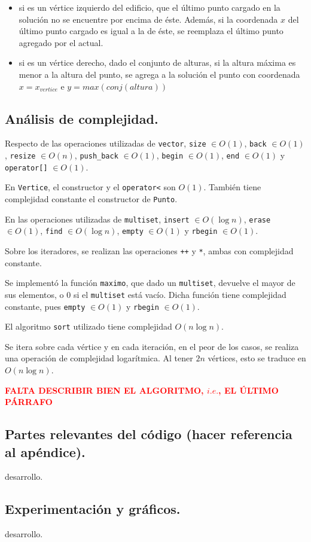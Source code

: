 \begin{itemize}
  \item si es un vértice izquierdo del edificio, que el último punto cargado en
  la solución no se encuentre por encima de éste. Además, si la coordenada $x$ 
  del último punto cargado es igual a la de éste, se reemplaza el último punto 
  agregado por el actual.
  
  \item si es un vértice derecho, dado el conjunto de alturas, si la altura 
  máxima es menor a la altura del punto, se agrega a la solución el punto con 
  coordenada $x = x_{vertice}$ e $y = max(conj(altura))$
\end{itemize}



\subsection{Análisis de complejidad.}

\vspace*{0.3cm}

Respecto de las operaciones utilizadas de \verb|vector|, \verb|size| $\in O(1)$,
\verb|back| $\in O(1)$, \verb|resize| $\in O(n)$, \verb|push_back| $\in O(1)$, 
\verb|begin| $\in O(1)$, \verb|end| $\in O(1)$ y \verb|operator[]| $\in O(1)$.

\noindent
En \verb|Vertice|, el constructor y el \verb|operator<| son $O(1)$. También 
tiene complejidad constante el constructor de \verb|Punto|.

\noindent
En las operaciones utilizadas de \verb|multiset|, \verb|insert| $\in O(\log n)$, 
\verb|erase| $\in O(1)$, \verb|find| $\in O(\log n)$, \verb|empty| $\in O(1)$ y 
\verb|rbegin| $\in O(1)$.

\noindent
Sobre los iteradores, se realizan las operaciones \verb|++| y \verb|*|, ambas
con complejidad constante.

\noindent
Se implementó la función \verb|maximo|, que dado un \verb|multiset|, devuelve 
el mayor de sus elementos, o 0 si el \verb|multiset| está vacío. Dicha función
tiene complejidad constante, pues \verb|empty| $\in O(1)$ y \verb|rbegin| $\in O(1)$.

\noindent
El algoritmo \verb|sort| utilizado tiene complejidad $O(n \log n)$.

\noindent
Se itera sobre cada vértice y en cada iteración, en el peor de los casos, se 
realiza una operación de complejidad logarítmica. Al tener $2n$ vértices, esto se
traduce en $O(n \log n)$.


\textcolor{red}{\textbf{FALTA DESCRIBIR BIEN EL ALGORITMO, $i.e.$, EL ÚLTIMO PÁRRAFO}}



\subsection{Partes relevantes del código (hacer referencia al apéndice).}

\vspace*{0.3cm}

desarrollo.



\subsection{Experimentación y gráficos.}

\vspace*{0.3cm}

desarrollo.
